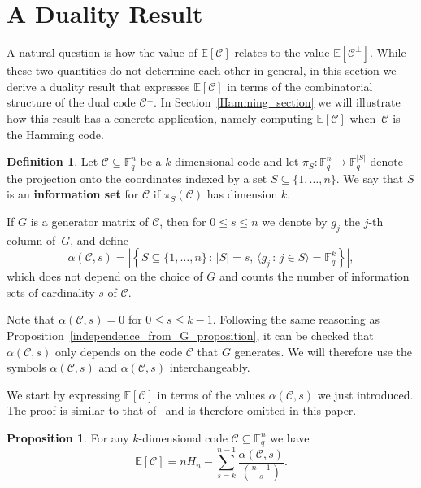 \documentclass[11pt,a4paper,reqno,twoside]{article}
\theoremstyle{definition}
\newtheorem{definition}[theorem]{Definition}
\newtheorem{proposition}[theorem]{Proposition}
\newcommand{\F}{\mathbb{F}}
\newcommand{\E}{\mathbb{E}}
\newcommand{\mC}{\mathcal{C}}
\begin{document}
\section{A Duality Result} \label{duality_section}

A natural question is how the value of $\E[\mC]$ relates to the value $\E[\mC^\perp]$. While these two quantities do not determine each other in general, in this section we derive a duality result
that expresses $\E[\mC]$ in terms of the combinatorial structure of the dual code $\mC^\perp$. In Section~\ref{Hamming_section} we will illustrate how this result 
has a concrete application, namely computing
$\E[\mC]$ when~$\mC$ is the Hamming code.

\begin{definition}
    Let $\mathcal{C} \subseteq \F_q^n$ be a $k$-dimensional code and let $\pi_S: \F_q^n \to \F_q^{|S|}$ denote the projection onto the coordinates indexed by a set $S \subseteq\{1, \ldots, n\}$. We say that 
    $S$ is an \textbf{information set} for $\mC$ if $\pi_S(\mC)$ has dimension $k$.

    If $G$ is a generator matrix of $\mC$,
    then for $0 \leq s \leq n$ we denote by $g_j$ the $j$-th column of~$G$, and define
    \[
    \alpha(\mC,s) = \left|\left\{ S \subseteq \{1, \ldots, n\} \, : \, |S| = s, \, \langle g_j \, : \, j \in S \rangle = \F_q^k\right\}\right|,
    \]
    which does not depend on the choice of $G$ and counts the number of information sets of cardinality $s$ of $\mC$. 
\end{definition}



Note that $\alpha(\mC,s) = 0$ for $0 \leq s \leq k-1$.
Following the same reasoning as Proposition~\ref{independence_from_G_proposition},
it can be checked that 
$\alpha(\mC,s)$ only depends
on the code $\mathcal{C}$ that $G$ generates. We will therefore use the symbols $\alpha(\mathcal{C},s)$ and $\alpha(\mC,s)$ interchangeably.


We start by expressing $\mathbb{E}[\mC]$ in terms of the values $\alpha(\mathcal{C},s)$ we just introduced.
The proof is similar to that of~\cite[Lemma~1]{a_combinatorial_perspective} and is therefore omitted in this paper.

\begin{proposition} \label{E_k[C]_general_formula}
For any $k$-dimensional code $\mC \subseteq \F_q^n$
we have 
    \[
    \mathbb{E}[\mathcal{C}] = nH_n -  \sum_{s=k}^{n-1} \frac{\alpha(\mathcal{C},s)}{\binom{n-1}{s}}.
    \]
\end{proposition}
\end{document}
